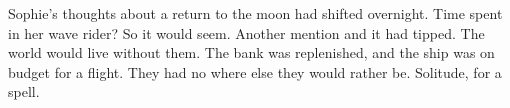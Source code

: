 

Sophie's thoughts about a return to the moon had shifted overnight.
Time spent in her wave rider?  So it would seem.  Another mention and
it had tipped.  The world would live without them.  The bank was
replenished, and the ship was on budget for a flight.  They had no
where else they would rather be.  Solitude, for a spell.

\bye
